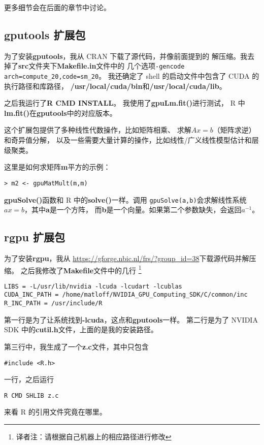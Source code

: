 更多细节会在后面的章节中讨论。

\subsection{gputools 扩展包}

为了安装{\bf gputools}，我从 CRAN 下载了源代码，并像前面提到的
解压缩。我去掉了{\bf src}文件夹下{\bf Makefile.in}文件中的
几个选项\texttt{-gencode arch=compute\_20,code=sm\_20}。
我还确定了 shell 的启动文件中包含了 CUDA 的执行路径和库路径，
{\bf /usr/local/cuda/bin}和{\bf /usr/local/cuda/lib}。

之后我运行了{\bf R CMD INSTALL}。
我使用了{\bf gpuLm.fit()}进行测试，
R 中{\bf lm.fit()}在{\bf gputools}中的对应版本。

这个扩展包提供了多种线性代数操作，比如矩阵相乘、
求解$Ax = b$（矩阵求逆）和奇异值分解，
以及一些需要大量计算的操作，比如线性/广义线性模型估计和层级聚类。

这里是如何求矩阵{\bf m}平方的示例：

\begin{lstlisting}
> m2 <- gpuMatMult(m,m)
\end{lstlisting}

{\bf gpuSolve()}函数和 R 中的{\bf solve()}一样。调用
\texttt{gpuSolve(a,b)}会求解线性系统$ax = b$，其中{\bf a}是一个方阵，
而{\bf b}是一个向量。如果第二个参数缺失，会返回$a^{-1}$。

\subsection{rgpu 扩展包}
\label{rgpu}

为了安装{\bf rgpu}，我从
\url{https://gforge.nbic.nl/frs/?group_id=38}下载源代码并解压缩。
之后我修改了{\bf Makefile}文件中的几行
\footnote{译者注：请根据自己机器上的相应路径进行修改}
\begin{lstlisting}
LIBS = -L/usr/lib/nvidia -lcuda -lcudart -lcublas
CUDA_INC_PATH = /home/matloff/NVIDIA_GPU_Computing_SDK/C/common/inc
R_INC_PATH = /usr/include/R
\end{lstlisting}

第一行是为了让系统找到{\bf -lcuda}，这点和{\bf gputools}一样。
第二行是为了 NVIDIA SDK 中的{\bf cutil.h}文件，上面的是我的安装路径。

第三行中，我生成了一个{\bf z.c}文件，其中只包含
\begin{lstlisting}
#include <R.h>
\end{lstlisting}
一行，之后运行
\begin{lstlisting}
R CMD SHLIB z.c
\end{lstlisting}
来看 R 的引用文件究竟在哪里。

